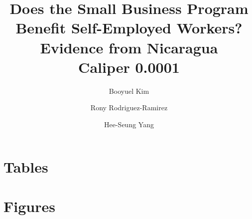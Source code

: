 \documentclass{article}
\begin{document}
\title{Does the Small Business Program Benefit Self-Employed Workers?  Evidence from Nicaragua \\ Caliper 0.0001} 
\author{Booyuel Kim \and Rony Rodriguez-Ramirez \and Hee-Seung Yang}
\maketitle
\listoftables
\listoffigures
\newpage 
\section{Tables}


\newpage 
\section{Figures}


\end{document}
